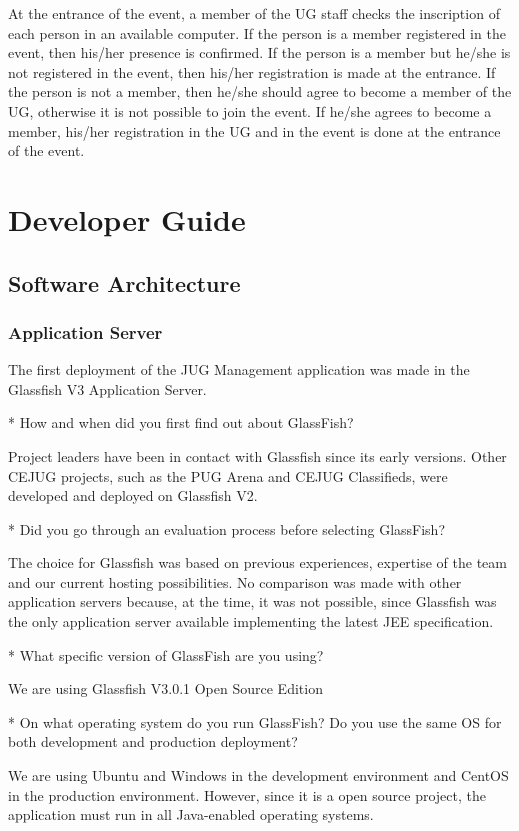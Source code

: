 \documentclass[10pt,a4paper]{report}
\begin{document}
At the entrance of the event, a member of the UG staff checks the inscription of each person in an available computer. If the person is a member registered in the event, then his/her presence is confirmed. If the person is a member but he/she is not registered in the event, then his/her registration is made at the entrance. If the person is not a member, then he/she should agree to become a member of the UG, otherwise it is not possible to join the event. If he/she agrees to become a member, his/her registration in the UG and in the event is done at the entrance of the event. 

\part{Developer Guide}
\chapter{Software Architecture}

\section{Application Server}
The first deployment of the JUG Management application was made in the Glassfish V3 Application Server. 

* How and when did you first find out about GlassFish?

Project leaders have been in contact with Glassfish since its early versions. Other CEJUG projects, such as the PUG Arena and CEJUG Classifieds, were developed and deployed on Glassfish V2.

* Did you go through an evaluation process before selecting GlassFish?

The choice for Glassfish was based on previous experiences, expertise of the team and our current hosting possibilities. No comparison was made with other application servers because, at the time, it was not possible, since Glassfish was the only application server available implementing the latest JEE specification.

* What specific version of GlassFish are you using?

We are using Glassfish V3.0.1 Open Source Edition

* On what operating system do you run GlassFish?  Do you use the same OS for
  both development and production deployment?
  
We are using Ubuntu and Windows in the development environment and CentOS in the production environment. However, since it is a open source project, the application must run in all Java-enabled operating systems.
\end{document}
